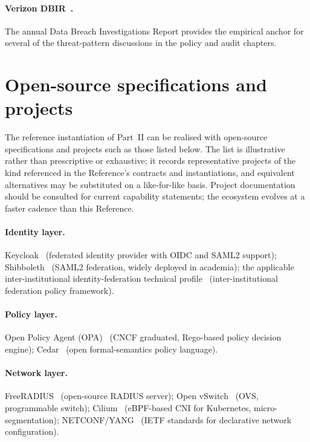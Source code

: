 \paragraph{Verizon DBIR~\cite{verizon-dbir}.} The annual Data
Breach Investigations Report provides the empirical anchor for
several of the threat-pattern discussions in the policy and audit
chapters.

\section{Open-source specifications and projects}
\label{sec:er-oss}

The reference instantiation of Part~II can be realised with
open-source specifications and projects such as those listed
below. The list is illustrative rather than prescriptive or
exhaustive; it records representative projects of the kind
referenced in the Reference's contracts and instantiations, and
equivalent alternatives may be substituted on a like-for-like
basis. Project documentation
should be consulted for current capability statements; the
ecosystem evolves at a faster cadence than this Reference.

\paragraph{Identity layer.} Keycloak~\cite{keycloak} (federated
identity provider with OIDC and SAML2 support);
Shibboleth~\cite{shibboleth} (SAML2 federation, widely deployed in
academia); the applicable inter-institutional identity-federation
technical profile~\cite{edugain}
(inter-institutional federation policy framework).

\paragraph{Policy layer.} Open Policy Agent (OPA)~\cite{opa-project}
(CNCF graduated, Rego-based policy decision engine);
Cedar~\cite{cedar-project} (open formal-semantics policy language).

\paragraph{Network layer.} FreeRADIUS~\cite{freeradius} (open-source
RADIUS server); Open vSwitch~\cite{openvswitch} (OVS, programmable
switch); Cilium~\cite{cilium} (eBPF-based CNI for Kubernetes,
micro-segmentation); NETCONF/YANG~\cite{rfc-6241-netconf,rfc-7950-yang}
(IETF standards for declarative network configuration).

